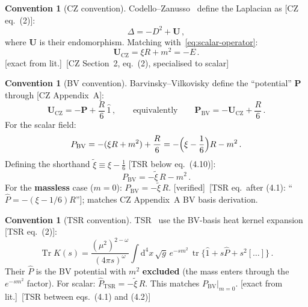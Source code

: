 \documentclass[12pt,a4paper]{article}
\theoremstyle{definition}
\newtheorem{convention}[proposition]{Convention}
\theoremstyle{remark}
\newcommand{\Tr}{\operatorname{Tr}}
\newcommand{\tr}{\operatorname{tr}}
\newcommand{\dd}{\mathrm{d}}
\newcommand{\fromlit}[1]{\textcolor{blue!70!black}{\textsf{[#1]}}}
\newcommand{\exactlit}{\textcolor{blue!60!black}{\textsf{[exact from lit.]}}}
\newcommand{\verified}{\textcolor{green!50!black}{\textsf{[verified]}}}
\begin{document}
\begin{convention}[CZ convention]
\label{conv:CZ}
Codello--Zanusso~\cite{CZ2012} define the Laplacian as
\fromlit{CZ eq.~(2)}:
\begin{equation}
  \Delta = -D^2 + \mathbf{U}\,,
  \label{eq:CZ-laplacian}
\end{equation}
where $\mathbf{U}$ is their endomorphism.
Matching with~\eqref{eq:scalar-operator}:
\begin{equation}
  \boxed{
  \mathbf{U}_{\mathrm{CZ}} = \xi R + m^2 = -E\,.
  }
  \label{eq:U-CZ-scalar}
\end{equation}
\exactlit\ \fromlit{CZ Section~2, eq.~(2), specialised to scalar}
\end{convention}

\begin{convention}[BV convention]
\label{conv:BV}
Barvinsky--Vilkovisky define the ``potential'' $\mathbf{P}$ through
\fromlit{CZ Appendix~A}:
\begin{equation}
  \mathbf{U}_{\mathrm{CZ}} = -\mathbf{P} + \frac{R}{6}\,\hat{1}\,,
  \qquad\text{equivalently}\qquad
  \mathbf{P}_{\mathrm{BV}} = -\mathbf{U}_{\mathrm{CZ}} + \frac{R}{6}\,.
  \label{eq:P-BV-def}
\end{equation}
For the scalar field:
\begin{equation}
  P_{\mathrm{BV}} = -(\xi R + m^2) + \frac{R}{6}
  = -\Bigl(\xi - \frac{1}{6}\Bigr)R - m^2\,.
  \label{eq:P-BV-scalar}
\end{equation}
Defining the shorthand
$\tilde{\xi} \equiv \xi - \frac{1}{6}$ \fromlit{TSR below eq.~(4.10)}:
\begin{equation}
  \boxed{
  P_{\mathrm{BV}} = -\tilde{\xi}\,R - m^2\,.
  }
  \label{eq:P-BV-tilde}
\end{equation}
For the \textbf{massless} case ($m=0$): $P_{\mathrm{BV}} = -\tilde{\xi}\,R$.
\verified\ \fromlit{TSR eq.\ after (4.1): ``$\hat{P} = -(\xi - 1/6)R$''};
matches CZ Appendix~A BV basis derivation.
\end{convention}

\begin{convention}[TSR convention]
\label{conv:TSR}
TSR~\cite{TSR2020} use the BV-basis heat kernel expansion
\fromlit{TSR eq.~(2)}:
\begin{equation}
  \Tr K(s) = \frac{(\mu^2)^{2-\omega}}{(4\pi s)^\omega}
  \int \dd^4 x\,\sqrt{g}\,e^{-sm^2}\,\tr\bigl\{
    \hat{1} + s\hat{P} + s^2[\ldots]\bigr\}\,.
  \label{eq:TSR-HK}
\end{equation}
Their $\hat{P}$ is the BV potential with $m^2$ \textbf{excluded}
(the mass enters through the $e^{-sm^2}$ factor).  For scalar:
$\hat{P}_{\mathrm{TSR}} = -\tilde{\xi}\,R$.
This matches $P_{\mathrm{BV}}|_{m=0}$.
\exactlit\ \fromlit{TSR between eqs.~(4.1) and (4.2)}
\end{convention}
\end{document}
